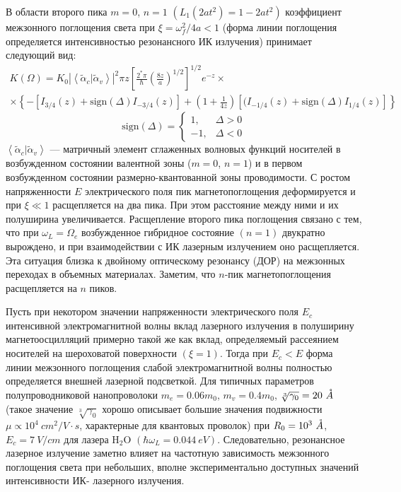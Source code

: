 В области второго пика $m=0$, $n=1$ $\left( L_1\left(2at^2\right)=1-2at^2 \right)$ коэффициент межзонного поглощения света при $\xi ={{\omega }^2_f}/{4a}<1$ (форма линии поглощения определяется интенсивностью резонансного ИК излучения) принимает следующий вид:
\begin{multline} \label{eq:syn_14}
K\left(\Omega\right)=K_0{\left|\left\langle \widetilde{\alpha }_c |\widetilde{\alpha }_v\right\rangle \right|}^2 \pi z{\left[\frac{2^* \pi }{\hbar }{\left(\frac{8z}{a}\right)}^{1/2}\right]}^{1/2}e^{-z}\times\\
\times \left\{-\left[I_{3/4}\left(z\right)+\mathrm{sign}(\Delta) I_{-3/4}\left(z\right)\right]+\left(1+\frac{1}{4z}\right)\left[(I_{-1/4}\left(z\right)+ \mathrm{sign}(\Delta)  I_{1/4}\left(z\right)\right]\right\}
\end{multline}
\[
\mathrm{sign}(\Delta) = \begin{cases}
1,&\Delta >0 \\ 
-1,&\Delta <0
\end{cases}
\] 
$\left\langle \widetilde{\alpha }_c |\widetilde{\alpha }_v \right\rangle$ --- матричный элемент сглаженных волновых функций носителей в возбужденном состоянии валентной зоны ($m=0$, $n=1$) и в первом возбужденном состоянии размерно-квантованной зоны проводимости.
С ростом напряженности $E$ электрического поля пик магнетопоглощения деформируется и при $\xi \ll 1$ расщепляется на два пика. При этом расстояние между ними и их полуширина увеличивается. Расщепление второго пика поглощения связано с тем, что при $\omega_L=\Omega_e$ возбужденное гибридное состояние $(n=1)$ двукратно вырождено, и при взаимодействии с ИК лазерным излучением оно расщепляется. Эта ситуация близка к двойному оптическому резонансу (ДОР) на межзонных переходах в объемных материалах.
Заметим, что $n$-пик магнетопоглощения расщепляется на $n$ пиков.

Пусть при некотором значении напряженности электрического поля $E_c$ интенсивной электромагнитной волны вклад лазерного излучения в полуширину магнетоосцилляций примерно такой же как вклад, определяемый рассеянием носителей на шероховатой поверхности $(\xi =1)$. Тогда при $E_c<E$ форма линии межзонного поглощения слабой электромагнитной волны полностью определяется внешней лазерной подсветкой. Для типичных параметров полупроводниковой нанопроволоки $m_e=0.06m_0$, $m_v=0.4m_0$, $\sqrt[3]{\gamma_0}=20\ \AA $ (такое значение $\sqrt[3]{\gamma_0}$ хорошо описывает большие значения подвижности $\mu \propto 10^4\ cm^2/V\cdot s$, характерные для квантовых проволок) при $R_0=10^3\ \AA $, $E_c= 7\ V / cm$ для лазера $\mathrm{H_2 O}$ $\left(\hbar {\omega }_L=0.044\ eV\right)$. Следовательно, резонансное лазерное излучение заметно влияет на частотную зависимость межзонного поглощения света при небольших, вполне экспериментально доступных значений интенсивности ИК- лазерного излучения.

